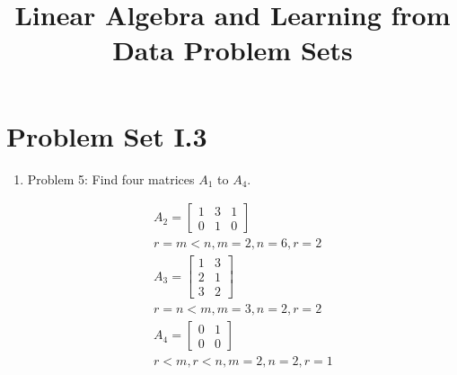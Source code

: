 \documentclass{article}
\title{Linear Algebra and Learning from Data Problem Sets}
\renewcommand{\(}{\left(}
\renewcommand{\)}{\right)}
\theoremstyle{plain}
\theoremstyle{plain}
\theoremstyle{definition}
\begin{document}
\maketitle

\section{Problem Set I.3}
\begin{enumerate}[label*=\arabic*.,ref=\arabic*]
\item Problem 5: Find four matrices $A_1$ to $A_4$.
\begin{shaded}
\begin{align*}
A_2 = \begin{bmatrix} 1 & 3 & 1 \\ 0 & 1 & 0 \end{bmatrix} \\
r = m < n, m = 2, n = 6, r = 2 \\
A_3 = \begin{bmatrix} 1 & 3 \\ 2 & 1 \\ 3 & 2 \end{bmatrix} \\
r = n < m, m = 3, n = 2, r = 2 \\
A_4 = \begin{bmatrix} 0 & 1 \\ 0 & 0 \end{bmatrix} \\
r < m, r < n, m = 2, n = 2, r = 1
\end{align*}
\end{shaded}
\end{enumerate}
\end{document}
